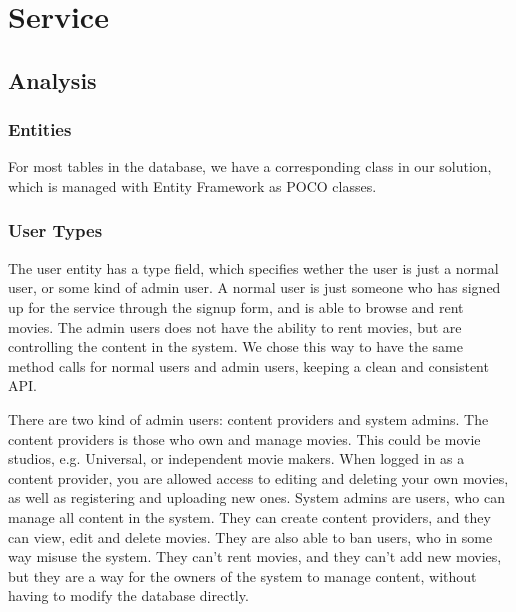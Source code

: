 \section{Service}
\label{Design_Service}

\subsection{Analysis}
\label{Design_Service_Analysis}

\subsubsection{Entities}
\label{Design_Service_Analysis_Entities}
For most tables in the database, we have a corresponding class in our solution, which is managed with Entity Framework as POCO classes. 

\subsubsection{User Types}
\label{Design_Service_Analysis_UserTypes}
The user entity has a type field, which specifies wether the user is just a normal user, or some kind of admin user. A normal user is just someone who has signed up for the service through the signup form, and is able to browse and rent movies. The admin users does not have the ability to rent movies, but are controlling the content in the system. We chose this way to have the same method calls for normal users and admin users, keeping a clean and consistent API. 

There are two kind of admin users: content providers and system admins. The content providers is those who own and manage movies. This could be movie studios, e.g. Universal, or independent movie makers. When logged in as a content provider, you are allowed access to editing and deleting your own movies, as well as registering and uploading new ones. System admins are users, who can manage all content in the system. They can create content providers, and they can view, edit and delete movies. They are also able to ban users, who in some way misuse the system. They can't rent movies, and they can't add new movies, but they are a way for the owners of the system to manage content, without having to modify the database directly.

